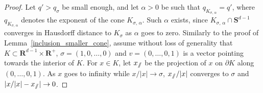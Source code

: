 \documentclass[10pt]{amsart}
\theoremstyle{definition}\newtheorem{defi}[theo]{Definition}\newtheorem{rema}[theo]{Remark}\newtheorem{exam}[theo]{Example}\newtheorem{exem}[theo]{Example}\newtheorem{nota}[theo]{Notation}
\newcommand{\bfS}{\mathbf{S}}
\newcommand{\bfR}{\mathbf{R}}
\newcommand{\sslash}{\slash\mkern-6.4mu\slash}
\begin{document}
\begin{proof}
Let $q'>q_{\sigma}$ be small enough, and let $\alpha>0$ be such that $q_{K_{\sigma,\,\alpha}}=q'$, where $q_{K_{\sigma,\,\alpha}}$ denotes the exponent of the cone $K_{\sigma,\,\alpha}$. Such $\alpha$ exists, since $K_{\sigma,\,\alpha}\cap \bfS^{d-1}$ converges in Hausdorff distance to $K_{\sigma}$ as $\alpha$ goes to zero. Similarly to the proof of Lemma~\ref{inclusion_smaller_cone}, assume without loss of generality that $K\subset \bfR^{d-1}\times \bfR^{+}$, $\sigma=(1,0,\ldots,0)$ and $v=(0,\ldots,0,1)$ is a vector pointing towards the interior of $K$. For $x\in K$, let $x_{\sslash}$ be the projection of $x$ on $\partial K$ along $(0,\ldots,0,1)$. As $x$ goes to infinity while $x/| x|\rightarrow \sigma$, $x_{\sslash}/| x|$ converges to $\sigma$ and $| x/| x|-x_{\sslash}|\rightarrow 0$.


\end{proof}
\end{document}
